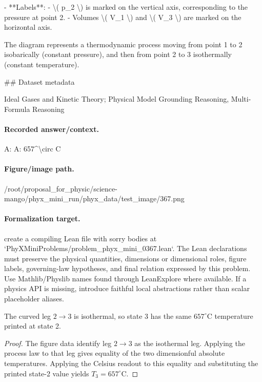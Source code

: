 - **Labels**:
  - \textbackslash{}( p\_2 \textbackslash{}) is marked on the vertical axis, corresponding to the pressure at point 2.
  - Volumes \textbackslash{}( V\_1 \textbackslash{}) and \textbackslash{}( V\_3 \textbackslash{}) are marked on the horizontal axis.
  
The diagram represents a thermodynamic process moving from point 1 to 2 isobarically (constant pressure), and then from point 2 to 3 isothermally (constant temperature).

\#\# Dataset metadata

Ideal Gases and Kinetic Theory; Physical Model Grounding Reasoning, Multi-Formula Reasoning

\paragraph{Recorded answer/context.}
A: A: 657\textasciicircum{}\textbackslash{}circ C

\paragraph{Figure/image path.}
/root/proposal\_for\_physic/science-mango/phyx\_mini\_run/phyx\_data/test\_image/367.png

\paragraph{Formalization target.}
create a compiling Lean file with sorry bodies at `PhyXMiniProblems/problem\_phyx\_mini\_0367.lean`. The Lean declarations must preserve the physical quantities, dimensions or dimensional roles, figure labels, governing-law hypotheses, and final relation expressed by this problem.
Use Mathlib/Physlib names found through LeanExplore where available. If a physics API is missing, introduce faithful local abstractions rather than scalar placeholder aliases.

\begin{theorem}
\label{thm:physics:phyx_mini_0367:target}
The curved leg \(2\to3\) is isothermal, so state 3 has the same
\(657^\circ\mathrm C\) temperature printed at state 2.
\end{theorem}
\begin{proof}
The figure data identify leg \(2\to3\) as the isothermal leg.  Applying the
process law to that leg gives equality of the two dimensionful absolute
temperatures.  Applying the Celsius readout to this equality and substituting
the printed state-2 value yields
\(T_3=657^\circ\mathrm C\).
\end{proof}

